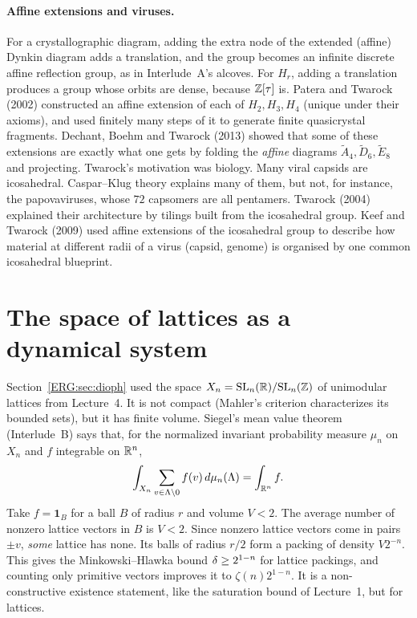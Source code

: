 \paragraph{Affine extensions and viruses.} For a crystallographic diagram, adding the extra node of the
extended (affine) Dynkin diagram adds a translation, and the group becomes an infinite discrete affine
reflection group, as in Interlude~A's alcoves. For $H_r$, adding a translation produces a group whose
orbits are dense, because $\mathbb{Z}[\tau]$ is. Patera and Twarock (2002) constructed an affine extension of each of
$H_2,H_3,H_4$ (unique under their axioms), and used finitely many steps of it to generate finite
quasicrystal fragments.
Dechant, Boehm and Twarock (2013) showed that some of these extensions are exactly what one gets by
folding the \emph{affine} diagrams $\tilde A_4,\tilde D_6,\tilde E_8$ and projecting. Twarock's
motivation was biology. Many viral capsids are icosahedral. Caspar--Klug theory explains many of them,
but not, for instance, the papovaviruses, whose $72$ capsomers are all pentamers. Twarock (2004)
explained their architecture by tilings built from the icosahedral group. Keef and Twarock (2009) used
affine extensions of the icosahedral group to describe how material at different radii of a virus
(capsid, genome) is organised by one common icosahedral blueprint.

\section{The space of lattices as a dynamical system}
\label{ERG:sec:lattices}

Section~\ref{ERG:sec:dioph} used the space $X_n=\mathrm{SL}_n(\mathbb{R})/\mathrm{SL}_n(\mathbb{Z})$ of unimodular lattices from
Lecture~4. It is not compact (Mahler's criterion characterizes its bounded sets), but it has finite
volume. Siegel's mean value theorem (Interlude~B) says that, for the normalized invariant probability
measure $\mu_n$ on $X_n$ and $f$ integrable on $\mathbb{R}^n$,
\[
  \int_{X_n}\sum_{v\in\Lambda\setminus0}f(v)\,d\mu_n(\Lambda)=\int_{\mathbb{R}^n}f .
\]
Take $f=\mathbf 1_B$ for a ball $B$ of radius $r$ and volume $V<2$. The average number of nonzero
lattice vectors in $B$ is $V<2$. Since nonzero lattice vectors come in pairs $\pm v$, \emph{some} lattice
has none. Its balls of radius $r/2$ form a packing of density $V2^{-n}$. This gives the Minkowski--Hlawka bound
$\delta\ge2^{1-n}$ for lattice packings, and counting only primitive vectors improves it to
$\zeta(n)2^{1-n}$. It is a non-constructive existence statement, like the saturation bound of
Lecture~1, but for lattices.

